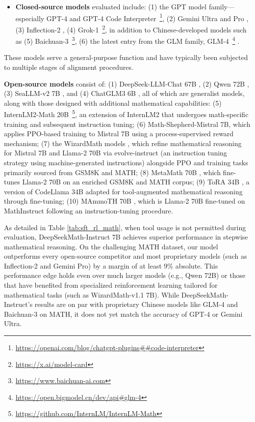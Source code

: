 \begin{itemize}[topsep=0pt]
    \item \textbf{Closed-source models} evaluated include: (1) the GPT model family—especially GPT-4 \citep{gpt4} and GPT-4 Code Interpreter~\footnote{\url{https://openai.com/blog/chatgpt-plugins\#\#code-interpreter}}, (2) Gemini Ultra and Pro \citep{gemini}, (3) Inflection-2 \citep{inflection-2}, (4) Grok-1~\footnote{\url{https://x.ai/model-card}}, in addition to Chinese-developed models such as (5) Baichuan-3~\footnote{\url{https://www.baichuan-ai.com}}, (6) the latest entry from the GLM family, GLM-4~\footnote{\url{https://open.bigmodel.cn/dev/api\#glm-4}} \citep{glm}.
\end{itemize}

These models serve a general-purpose function and have typically been subjected to multiple stages of alignment procedures.
    \item \textbf{Open-source models} consist of: (1) DeepSeek-LLM-Chat 67B \citep{deepseek-llm}, (2) Qwen 72B \citep{qwen}, (3) SeaLLM-v2 7B \citep{seallm}, and (4) ChatGLM3 6B \citep{chatglm3}, all of which are generalist models, along with those designed with additional mathematical capabilities: (5) InternLM2-Math 20B~\footnote{\url{https://github.com/InternLM/InternLM-Math}}, an extension of InternLM2 that undergoes math-specific training and subsequent instruction tuning; (6) Math-Shepherd-Mistral 7B, which applies PPO-based training \citep{schulman2017proximal} to Mistral 7B \citep{mistral} using a process-supervised reward mechanism; (7) the WizardMath models \citep{wizardmath}, which refine mathematical reasoning for Mistral 7B and Llama-2 70B \citep{llama2} via evolve-instruct (an instruction tuning strategy using machine-generated instructions) alongside PPO and training tasks primarily sourced from GSM8K and MATH; (8) MetaMath 70B \citep{metamath}, which fine-tunes Llama-2 70B on an enriched GSM8K and MATH corpus; (9) ToRA 34B \cite{tora}, a version of CodeLlama 34B adapted for tool-augmented mathematical reasoning through fine-tuning; (10) MAmmoTH 70B \citep{MathInstruct}, which is Llama-2 70B fine-tuned on MathInstruct following an instruction-tuning procedure.

As detailed in Table \ref{tab:sft_rl_math}, when tool usage is not permitted during evaluation, DeepSeekMath-Instruct 7B achieves superior performance in stepwise mathematical reasoning. On the challenging MATH dataset, our model outperforms every open-source competitor and most proprietary models (such as Inflection-2 and Gemini Pro) by a margin of at least 9\% absolute. This performance edge holds even over much larger models (e.g., Qwen 72B) or those that have benefited from specialized reinforcement learning tailored for mathematical tasks (such as WizardMath-v1.1 7B). While DeepSeekMath-Instruct's results are on par with proprietary Chinese models like GLM-4 and Baichuan-3 on MATH, it does not yet match the accuracy of GPT-4 or Gemini Ultra.

